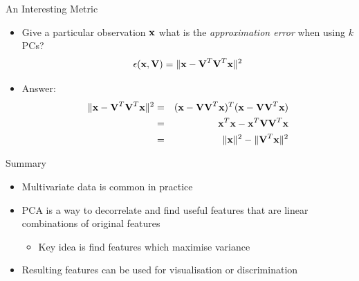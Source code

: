 \documentclass{beamer}
\begin{document}
\begin{frame}{An Interesting Metric} 
\begin{itemize} 
 \item Give a particular observation $\textbf{x}$ what is the \emph{approximation error} when using $k$ PCs?
 \begin{displaymath} 
  \epsilon(\textbf{x}, \textbf{V}) = \|\textbf{x} - \textbf{V}^T\textbf{V}^T\textbf{x}\|^2
 \end{displaymath}
\item Answer:
\begin{eqnarray*} 
  \|\textbf{x} - \textbf{V}^T\textbf{V}^T\textbf{x}\|^2 &=& (\textbf{x} - \textbf{V}\textbf{V}^T\textbf{x})^T (\textbf{x} - \textbf{V}\textbf{V}^T\textbf{x}) \\ 
   &=& \textbf{x}^T\textbf{x} - \textbf{x}^T\textbf{V}\textbf{V}^T\textbf{x} \\ 
   &=& \|\textbf{x}\|^2 - \|\textbf{V}^T\textbf{x}\|^2
\end{eqnarray*}
\end{itemize}
\end{frame}

\begin{frame}{Summary} 
\begin{itemize}
 \item Multivariate data is common in practice 
 \item PCA is a way to decorrelate and find useful features that are linear combinations of original features 
 \begin{itemize}
  \item Key idea is find features which maximise variance 
 \end{itemize}
 \item Resulting features can be used for visualisation or discrimination 
\end{itemize}
\end{frame}
\end{document}
